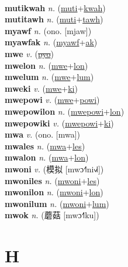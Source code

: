  \label{mutiki} \\
\textbf{mutikwah} \textit{n.} (\hyperref[muti]{muti}+\hyperref[kwah]{kwah})
 \label{mutikwah} \\
\textbf{mutitawh} \textit{n.} (\hyperref[muti]{muti}+\hyperref[tawh]{tawh})
 \label{mutitawh} \\
\textbf{myawf} \textit{n.} (ono. [mjaw])
 \label{myawf} \\
\textbf{myawfak} \textit{n.} (\hyperref[myawf]{myawf}+\hyperref[ak]{ak})
 \label{myawfak} \\
\textbf{mwe} \textit{v.} (\hyperref[pyo]{\sout{pyo}})
 \label{mwe} \\
\textbf{mwelon} \textit{n.} (\hyperref[mwe]{mwe}+\hyperref[lon]{lon})
 \label{mwelon} \\
\textbf{mwelum} \textit{n.} (\hyperref[mwe]{mwe}+\hyperref[lum]{lum})
 \label{mwelum} \\
\textbf{mweki} \textit{v.} (\hyperref[mwe]{mwe}+\hyperref[ki]{ki})
 \label{mweki} \\
\textbf{mwepowi} \textit{v.} (\hyperref[mwe]{mwe}+\hyperref[powi]{powi})
 \label{mwepowi} \\
\textbf{mwepowilon} \textit{n.} (\hyperref[mwepowi]{mwepowi}+\hyperref[lon]{lon})
 \label{mwepowilon} \\
\textbf{mwepowiki} \textit{v.} (\hyperref[mwepowi]{mwepowi}+\hyperref[ki]{ki})
 \label{mwepowiki} \\
\textbf{mwa} \textit{v.} (ono. [mwa])
 \label{mwa} \\
\textbf{mwales} \textit{n.} (\hyperref[mwa]{mwa}+\hyperref[les]{les})
 \label{mwales} \\
\textbf{mwalon} \textit{n.} (\hyperref[mwa]{mwa}+\hyperref[lon]{lon})
 \label{mwalon} \\
\textbf{mwoni} \textit{v.} ({\chinese{}模拟} [mwɔ˧˥ni˧˩˧])
 \label{mwoni} \\
\textbf{mwoniles} \textit{n.} (\hyperref[mwoni]{mwoni}+\hyperref[les]{les})
 \label{mwoniles} \\
\textbf{mwonilon} \textit{n.} (\hyperref[mwoni]{mwoni}+\hyperref[lon]{lon})
 \label{mwonilon} \\
\textbf{mwonilum} \textit{n.} (\hyperref[mwoni]{mwoni}+\hyperref[lum]{lum})
 \label{mwonilum} \\
\textbf{mwok} \textit{n.} ({\chinese{}蘑菇} [mwɔ˧˥ku])
 \label{mwok} 

\section{H}

